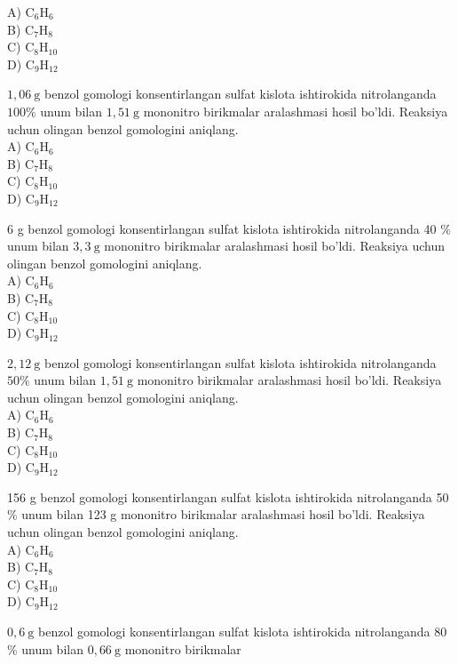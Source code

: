 A) $\mathrm{C}_{6} \mathrm{H}_{6}$\\
B) $\mathrm{C}_{7} \mathrm{H}_{8}$\\
C) $\mathrm{C}_{8} \mathrm{H}_{10}$\\
D) $\mathrm{C}_{9} \mathrm{H}_{12}$
  \item $1,06 \mathrm{~g}$ benzol gomologi konsentirlangan sulfat kislota ishtirokida nitrolanganda $100 \%$ unum bilan $1,51 \mathrm{~g}$ mononitro birikmalar aralashmasi hosil bo'ldi. Reaksiya uchun olingan benzol gomologini aniqlang.\\
A) $\mathrm{C}_{6} \mathrm{H}_{6}$\\
B) $\mathrm{C}_{7} \mathrm{H}_{8}$\\
C) $\mathrm{C}_{8} \mathrm{H}_{10}$\\
D) $\mathrm{C}_{9} \mathrm{H}_{12}$
  \item 6 g benzol gomologi konsentirlangan sulfat kislota ishtirokida nitrolanganda 40 $\%$ unum bilan $3,3 \mathrm{~g}$ mononitro birikmalar aralashmasi hosil bo'ldi. Reaksiya uchun olingan benzol gomologini aniqlang.\\
A) $\mathrm{C}_{6} \mathrm{H}_{6}$\\
B) $\mathrm{C}_{7} \mathrm{H}_{8}$\\
C) $\mathrm{C}_{8} \mathrm{H}_{10}$\\
D) $\mathrm{C}_{9} \mathrm{H}_{12}$
  \item $2,12 \mathrm{~g}$ benzol gomologi konsentirlangan sulfat kislota ishtirokida nitrolanganda $50 \%$ unum bilan $1,51 \mathrm{~g}$ mononitro birikmalar aralashmasi hosil bo'ldi. Reaksiya uchun olingan benzol gomologini aniqlang.\\
A) $\mathrm{C}_{6} \mathrm{H}_{6}$\\
B) $\mathrm{C}_{7} \mathrm{H}_{8}$\\
C) $\mathrm{C}_{8} \mathrm{H}_{10}$\\
D) $\mathrm{C}_{9} \mathrm{H}_{12}$
  \item 156 g benzol gomologi konsentirlangan sulfat kislota ishtirokida nitrolanganda 50 $\%$ unum bilan 123 g mononitro birikmalar aralashmasi hosil bo'ldi. Reaksiya uchun olingan benzol gomologini aniqlang.\\
A) $\mathrm{C}_{6} \mathrm{H}_{6}$\\
B) $\mathrm{C}_{7} \mathrm{H}_{8}$\\
C) $\mathrm{C}_{8} \mathrm{H}_{10}$\\
D) $\mathrm{C}_{9} \mathrm{H}_{12}$
  \item $0,6 \mathrm{~g}$ benzol gomologi konsentirlangan sulfat kislota ishtirokida nitrolanganda 80 $\%$ unum bilan $0,66 \mathrm{~g}$ mononitro birikmalar\\

